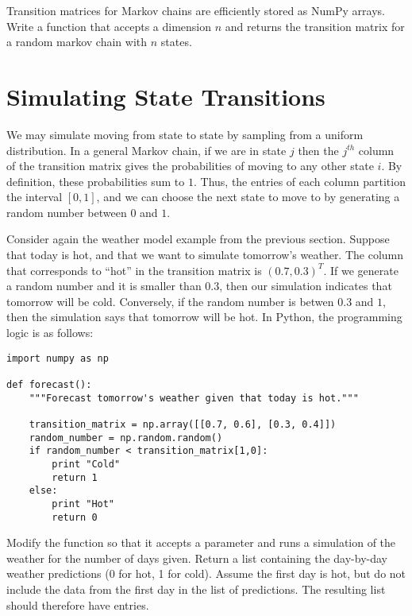 \begin{problem}
Transition matrices for Markov chains are efficiently stored as NumPy arrays.
Write a function that accepts a dimension $n$ and returns the transition matrix for a random markov chain with $n$ states.
\end{problem}

\section*{Simulating State Transitions}

We may simulate moving from state to state by sampling from a uniform distribution.
In a general Markov chain, if we are in state $j$ then the $j^{th}$ column of the transition matrix gives the probabilities of moving to any other state $i$.
By definition, these probabilities sum to $1$.
Thus, the entries of each column partition the interval $[0, 1]$, and we can choose the next state to move to by generating a random number between $0$ and $1$.

Consider again the weather model example from the previous section.
Suppose that today is hot, and that we want to simulate tomorrow's weather.
The column that corresponds to ``hot'' in the transition matrix is $(0.7, 0.3)^T$.
If we generate a random number and it is smaller than $0.3$, then our simulation indicates that tomorrow will be cold.
Conversely, if the random number is betwen $0.3$ and $1$, then the simulation says that tomorrow will be hot.
In Python, the programming logic is as follows:

\begin{lstlisting}
import numpy as np

def forecast():
	"""Forecast tomorrow's weather given that today is hot."""

	transition_matrix = np.array([[0.7, 0.6], [0.3, 0.4]])
	random_number = np.random.random()
	if random_number < transition_matrix[1,0]:
		print "Cold"
		return 1
	else:
		print "Hot"
		return 0
\end{lstlisting}

\begin{problem}
Modify the  function so that it accepts a parameter  and runs a simulation of the weather for the number of days given.
Return a list containing the day-by-day weather predictions (0 for hot, 1 for cold).
Assume the first day is hot, but do not include the data from the first day in the list of predictions.
The resulting list should therefore have  entries.
\end{problem}

